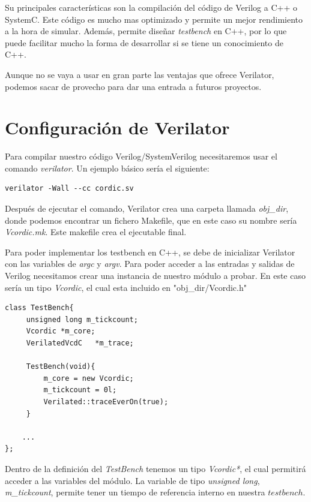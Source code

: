 Su principales características son la compilación del código de Verilog a C++ o SystemC. Este código es mucho mas optimizado y permite un mejor rendimiento a la hora de simular. Además, permite diseñar \textit{testbench} en C++, por lo que puede facilitar mucho la forma de desarrollar si se tiene un conocimiento de C++.

Aunque no se vaya a usar en gran parte las ventajas que ofrece Verilator, podemos sacar de provecho para dar una entrada a futuros proyectos.

\section{Configuración de Verilator}
Para compilar nuestro código Verilog/SystemVerilog necesitaremos usar el comando \textit{verilator}. Un ejemplo básico sería el siguiente:

\begin{lstlisting}
verilator -Wall --cc cordic.sv
\end{lstlisting}

Después de ejecutar el comando, Verilator crea una carpeta llamada \textit{obj\_dir}, donde podemos encontrar un fichero Makefile, que en este caso su nombre sería \textit{Vcordic.mk}. Este makefile crea el ejecutable final.

Para poder implementar los testbench en C++, se debe de inicializar Verilator con las variables de \textit{argc} y \textit{argv}. Para poder acceder a las entradas y salidas de Verilog necesitamos crear una instancia de nuestro módulo a probar. En este caso sería un tipo \textit{Vcordic}, el cual esta incluido en "obj\_dir/Vcordic.h"

\begin{lstlisting}[caption={Definición de una TestBench de Verilator}] 
class TestBench{
     unsigned long m_tickcount;
     Vcordic *m_core;
     VerilatedVcdC   *m_trace;
     
     TestBench(void){
         m_core = new Vcordic;
         m_tickcount = 0l;
         Verilated::traceEverOn(true);
     }
     
	...
};
\end{lstlisting}

Dentro de la definición del \textit{TestBench} tenemos un tipo \textit{Vcordic*}, el cual permitirá acceder a las variables del módulo. La variable de tipo \textit{unsigned long}, \textit{m\_tickcount}, permite tener un tiempo de referencia interno en nuestra $testbench$.

